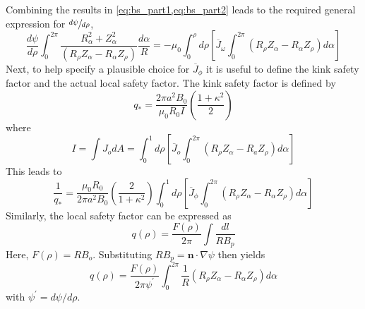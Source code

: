 Combining the results in \cref{eq:bs_part1,eq:bs_part2} leads to the required general expression for $\sfrac{ d\psi }{ d \rho }$,
\begin{equation}
\label{eq:bs_parta}
\frac { d \psi } { d \rho } \int _ { 0 } ^ { 2 \pi } \frac { R _ { \alpha } ^ { 2 } + Z _ { \alpha } ^ { 2 } } { \left( R _ { \rho } Z _ { \alpha } - R _ { \alpha } Z _ { \rho } \right) } \frac { d \alpha } { R } = - \mu _ { 0 } \int _ { 0 } ^ { \rho } d \rho \left[ \overline { J } _ { \omega } \int _ { 0 } ^ { 2 \pi } \left( R _ { \rho } Z _ { \alpha } - R _ { \alpha } Z _ { \rho } \right) d \alpha \right]
\end{equation}
Next, to help specify a plausible choice for $\overline { J } _ { \phi } $ it is useful to define the kink safety factor and the actual local safety factor. The kink safety factor is defined by
\begin{equation}
q _ { * } = \frac { 2 \pi a ^ { 2 } B _ { 0 } } { \mu _ { 0 } R _ { 0 } I } \left( \frac { 1 + \kappa ^ { 2 } } { 2 } \right)
\end{equation}
where
\begin{equation}
I = \int J _ { o } d A = \int _ { 0 } ^ { 1 } d \rho \left[ \overline { J } _ { o } \int _ { 0 } ^ { 2 \pi } \left( R _ { \rho } Z _ { \alpha } - R _ { a } Z _ { \rho } \right) d \alpha \right]
\end{equation}
This leads to 
\begin{equation}
\label{eq:bs_partb}
\frac { 1 } { q _ { * } } = \frac { \mu _ { 0 } R _ { 0 } } { 2 \pi a ^ { 2 } B _ { 0 } } \left( \frac { 2 } { 1 + \kappa ^ { 2 } } \right) \int _ { 0 } ^ { 1 } d \rho \left[ \overline { J } _ { \phi } \int _ { 0 } ^ { 2 \pi } \left( R _ { \rho } Z _ { \alpha } - R _ { \alpha } Z _ { \rho } \right) d \alpha \right]
\end{equation}
Similarly, the local safety factor can be expressed as
\begin{equation}
q ( \rho ) = \frac { F ( \rho ) } { 2 \pi } \int \frac { d l } { R B _ { p } }
\end{equation}
Here, $F ( \rho ) = R B _ { o }$. Substituting $R B _ { p } = \mathbf { n } \cdot \nabla \psi$ then yields
\begin{equation}
\label{eq:bs_partc}
q ( \rho ) = \frac { F ( \rho ) } { 2 \pi \psi ^ { \prime } } \int _ { 0 } ^ { 2 \pi } \frac { 1 } { R } \left( R _ { \rho } Z _ { \alpha } - R _ { \alpha } Z _ { \rho } \right) d \alpha	
\end{equation}
with $\psi ^ { \prime } = d \psi / d \rho$.

